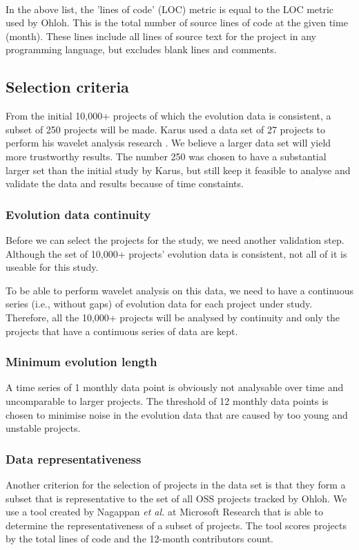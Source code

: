 \paragraph{}
In the above list, the 'lines of code' (LOC) metric is equal to the LOC metric
used by Ohloh. This is the total number of source lines of code at the given
time (month). These lines include all lines of source text for the project in
any programming language, but excludes blank lines and comments.

\subsection{Selection criteria}

From the initial 10,000+ projects of which the evolution data is consistent, a
subset of 250 projects will be made. Karus used a data set of 27 projects to
perform his wavelet analysis research \cite{karus2013}. We believe a larger
data set will yield more trustworthy results. The number 250 was chosen to have
a substantial larger set than the initial study by Karus, but still keep it
feasible to analyse and validate the data and results because of time
constaints.

\subsubsection{Evolution data continuity}
Before we can select the projects for the study, we need another validation
step. Although the set of 10,000+ projects' evolution data is consistent, not
all of it is useable for this study.

To be able to perform wavelet analysis on this data, we need to have a
continuous series (i.e., without gaps) of evolution data for each project under
study. Therefore, all the 10,000+ projects will be analysed by continuity and
only the projects that have a continuous series of data are kept.

\subsubsection{Minimum evolution length}
A time series of 1 monthly data point is obviously not analysable over time and
uncomparable to larger projects. The threshold of 12 monthly data points is
chosen to minimise noise in the evolution data that are caused by too young and
unstable projects. 

\subsubsection{Data representativeness}
Another criterion for the selection of projects in the data set is that they
form a subset that is representative to the set of all OSS projects tracked by
Ohloh. We use a tool created by Nagappan \emph{et al. }\rm\cite{nagappan} at
Microsoft Research that is able to determine the representativeness of a subset of
projects. The tool scores projects by the total lines of code
and the 12-month contributors count.

